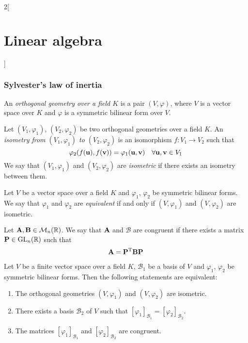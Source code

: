 \documentclass[../../../main.tex]{subfiles}
\begin{document}
\begin{multicols}{2}[\section{Linear algebra}]
  \subsubsection{Sylvester's law of inertia}
  \begin{definition}
    An \textit{orthogonal geometry over a field $K$} is a pair $(V,\varphi)$, where $V$ is a vector space over $K$ and $\varphi$ is a symmetric bilinear form over $V$.
  \end{definition}
  \begin{definition}\label{isometry}
    Let $(V_1,\varphi_1)$, $(V_2,\varphi_2)$ be two orthogonal geometries over a field $K$. An \textit{isometry from $(V_1,\varphi_1)$ to $(V_2,\varphi_2)$} is an isomorphism $f:V_1\rightarrow V_2$ such that $$\varphi_2(f(\boldsymbol{\mathrm{u}}),f(\boldsymbol{\mathrm{v}}))=\varphi_1(\boldsymbol{\mathrm{u}},\boldsymbol{\mathrm{v}})\quad\forall\boldsymbol{\mathrm{u}},\boldsymbol{\mathrm{v}}\in V_1$$ We say that $(V_1,\varphi_1)$ and $(V_2,\varphi_2)$ are \textit{isometric} if there exists an isometry between them.
  \end{definition}
  \begin{definition}
    Let $V$ be a vector space over a field $K$ and $\varphi_1$, $\varphi_2$ be symmetric bilinear forms. We say that $\varphi_1$ and $\varphi_2$ are \textit{equivalent} if and only if $(V,\varphi_1)$ and $(V,\varphi_2)$ are isometric.
  \end{definition}
  \begin{definition}
    Let $\boldsymbol{\mathrm{A}},\boldsymbol{\mathrm{B}}\in\mathcal{M}_n(\mathbb{R})$. We say that $\boldsymbol{\mathrm{A}}$ and $\mathcal{B}$ are congruent if there exists a matrix $\boldsymbol{\mathrm{P}}\in\mathrm{GL}_n(\mathbb{R})$ such that $$\boldsymbol{\mathrm{A}}=\vb{P}^{\mathrm{T}}\boldsymbol{\mathrm{B}}\boldsymbol{\mathrm{P}}$$
  \end{definition}
  \begin{prop}
    Let $V$ be a finite vector space over a field $K$, $\mathcal{B}_1$ be a basis of $V$ and $\varphi_1$, $\varphi_2$ be symmetric bilinear forms. Then the following statements are equivalent:
    \begin{enumerate}
      \item The orthogonal geometries $(V,\varphi_1)$ and $(V,\varphi_2)$ are isometric.
      \item There exists a basis $\mathcal{B}_2$ of $V$ such that $[\varphi_1]_{\mathcal{B}_1}=[\varphi_2]_{\mathcal{B}_2}$.
      \item The matrices $[\varphi_1]_{\mathcal{B}_1}$ and $[\varphi_2]_{\mathcal{B}_2}$ are congruent.

\end{enumerate}
\end{prop}
\end{multicols}
\end{document}
